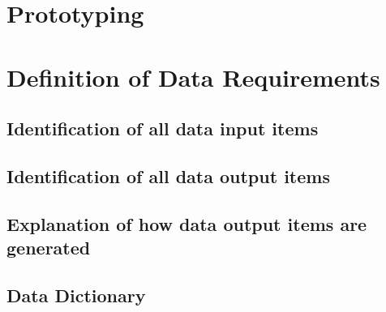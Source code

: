 \section{Prototyping}

\section{Definition of Data Requirements}

\subsection{Identification of all data input items}

\subsection{Identification of all data output items}

\subsection{Explanation of how data output items are generated}

\subsection{Data Dictionary}

